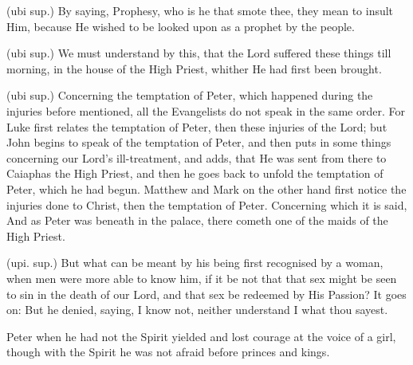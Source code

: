  (ubi sup.) By saying, Prophesy, who is he that smote thee, they mean to insult Him, because He wished to be looked upon as a prophet by the people.

 (ubi sup.) We must understand by this, that the Lord suffered these things till morning, in the house of the High Priest, whither He had first been brought.

 

 (ubi sup.) Concerning the temptation of Peter, which happened during the injuries before mentioned, all the Evangelists do not speak in the same order. For Luke first relates the temptation of Peter, then these injuries of the Lord; but John begins to speak of the temptation of Peter, and then puts in some things concerning our Lord’s ill-treatment, and adds, that He was sent from there to Caiaphas the High Priest, and then he goes back to unfold the temptation of Peter, which he had begun. Matthew and Mark on the other hand first notice the injuries done to Christ, then the temptation of Peter. Concerning which it is said, And as Peter was beneath in the palace, there cometh one of the maids of the High Priest.

 (upi. sup.) But what can be meant by his being first recognised by a woman, when men were more able to know him, if it be not that that sex might be seen to sin in the death of our Lord, and that sex be redeemed by His Passion? It goes on: But he denied, saying, I know not, neither understand I what thou sayest.

 Peter when he had not the Spirit yielded and lost courage at the voice of a girl, though with the Spirit he was not afraid before princes and kings.

